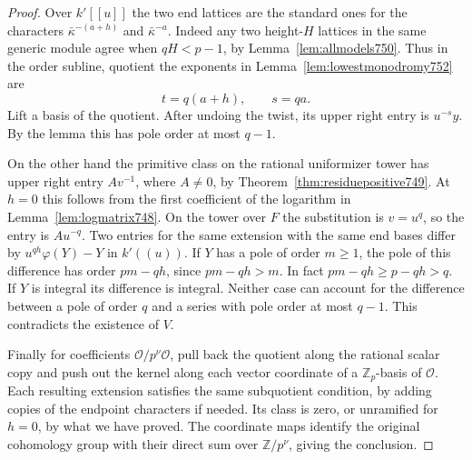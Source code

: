 \documentclass[a4paper,11pt]{article}
\theoremstyle{definition}
\theoremstyle{remark}
\newcommand{\ZZ}{\mathbb Z}\newcommand{\ord}{\operatorname{ord}}
\numberwithin{equation}{section}
\begin{document}
\begin{proof}
Over \(k'[[u]]\) the two end lattices are the standard ones for
the characters \(\bar\kappa^{-(a+h)}\) and
\(\bar\kappa^{-a}\). Indeed any two height-\(H\) lattices in the
same generic module agree when \(qH<p-1\), by
Lemma~\ref{lem:allmodels750}. Thus in the order subline, quotient
the exponents in Lemma~\ref{lem:lowestmonodromy752} are
\[
                         t=q(a+h),\qquad s=qa .
\]
Lift a basis of the quotient. After undoing the twist, its
upper right entry is \(u^{-s}y\). By the lemma this has pole
order at most \(q-1\).

On the other hand the primitive class on the rational
uniformizer tower has upper right entry \(A v^{-1}\), where
\(A\ne0\), by Theorem~\ref{thm:residuepositive749}. At \(h=0\)
this follows from the first coefficient of the logarithm in
Lemma~\ref{lem:logmatrix748}. On the tower over \(F\) the
substitution is \(v=u^q\), so the entry is \(A u^{-q}\).
Two entries for the same extension with the same end bases
differ by \(u^{qh}\varphi(Y)-Y\) in \(k'((u))\).
If \(Y\) has a pole of order \(m\ge1\), the pole of this
difference has order \(pm-qh\), since \(pm-qh>m\).
In fact \(pm-qh\ge p-qh>q\).
If \(Y\) is integral its difference is integral.
Neither case can account for the difference between a pole of
order \(q\) and a series with pole order at most \(q-1\).
This contradicts the existence of \(V\).

Finally for coefficients \(\mathcal O/p^\nu\mathcal O\), pull
back the quotient along the rational scalar copy and push out
the kernel along each vector coordinate of a \(\ZZ_p\)-basis
of \(\mathcal O\). Each resulting extension satisfies the same
subquotient condition, by adding copies of the endpoint
characters if needed. Its class is zero, or unramified for
\(h=0\), by what we have proved. The coordinate maps identify
the original cohomology group with their direct sum over
\(\ZZ/p^\nu\), giving the conclusion.
\end{proof}
\end{document}
